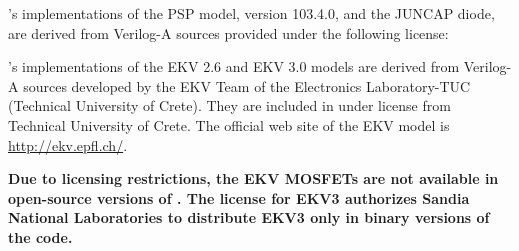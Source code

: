 \Xyce{}'s implementations of the PSP model, version 103.4.0, and the JUNCAP
diode, are derived from Verilog-A sources provided under the following license:


\Xyce{}'s implementations of the EKV 2.6 and EKV 3.0 models are derived from
Verilog-A sources developed by the EKV Team of the Electronics Laboratory-TUC
(Technical University of Crete).  They are included in \Xyce{} under license
from Technical University of Crete.  The official web site of the EKV model is
\url{http://ekv.epfl.ch/}.

\textbf{Due to licensing restrictions, the EKV MOSFETs are not available in
     open-source versions of \Xyce{}.  The license for EKV3 authorizes Sandia
     National Laboratories to distribute EKV3 only in binary versions of the code.}

